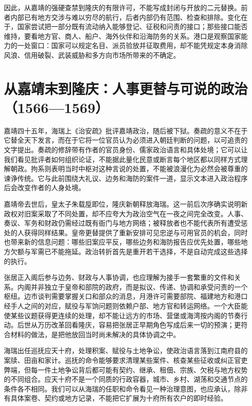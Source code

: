 因此，从嘉靖的强硬查禁到隆庆的有限许可，不能写成封闭与开放的二元替换。前者内部已有地方交涉与难以穷尽的航行，后者内部仍有范围、检查和排除。变化在于，国家尝试把一部分既有流动纳入能够登记、征税和问责的接口；那些接口能否维持，要看地方官、商人、船户、海外伙伴和沿海防务的关系。港口是观察国家能力的一处窗口：国家可以规定名目、派员验放并征取费用，却不能凭规定本身消除风浪、信用破裂、武装威胁和多方向市场所带来的不确定。

\section{从嘉靖末到隆庆：人事更替与可说的政治（1566—1569）}

嘉靖四十五年，海瑞上《治安疏》批评嘉靖政治，随后被下狱。奏疏的意义不在于它替全天下发言，而在于它将一位官员认为必须进入朝廷判断的问题，以可追责的文字提出。奏疏的修辞带有作者的官员身份、儒家政治语言和具体处境；它可以让我们看见批评者如何组织论证，不能据此量化民意或断言每个地区都以同样方式理解朝政。拘系则表明当时中枢对这种言说的处置，不能被浪漫化为必然会被尊重的谏诤传统。它与此前围绕大礼议、边务和海防的案件一道，显示文本进入政治程序后会改变作者的人身处境。

嘉靖帝去世后，皇太子朱载垕即位，隆庆新朝释放海瑞。这一前后次序确实说明新政权对旧案采取了不同处置，却不应夸大为政治空气在一夜之间完全改变。人事、奏议、军务和财政仍需经过既有衙门与地方网络；被释放者也不能代表所有遭受惩处的人获得同样结果。皇帝更替提供了重新安排可见忠逆与可用官员的机会，同时也带来新的信息问题：哪些旧案应平反，哪些边务和海防报告应优先处置，哪些地方欠额与军需已不能拖延。政治转折首先是重开若干选择，不是自动完成这些选择的执行。

张居正入阁后参与边务、财政与人事协调，也应理解为接手一套繁重的文件和关系。内阁并非独立于皇帝和部院的政府，而是拟议、传递、协调和承受问责的一个枢纽。边市谈判需要掌握关口和部众的消息，月港许可需要部院、福建地方和港口经手人之间的对应，赋役与军饷问题则依赖户部、地方官和转运网络。一个大臣能使某些议题获得更连续的处理，却不能让远方的市场、营堡或海湾按内阁的节奏行动。后世从万历改革回看隆庆，容易把张居正早期角色写成后来一切的预演；更符合材料的做法，是把他放回当时尚未解决的具体协调之中。

海瑞出任巡抚应天十府，处理积案、赋役与土地争讼，使政治语言落到江南府县的案牍、田亩和家计。巡抚的命令能够要求清理某些案件、核查某些征收或纠正官吏弊端，但每一件土地争讼背后都可能有契约、继承、租佃、宗族、欠税与地方权势的不同组合。应天十府不是一个同质的行政容器，城市、乡村、湖荡和交通节点的条件各不相同。我们可以从海瑞的任职和命令看见一种治理意图，也应承认，除非有具体案卷、契约或地方记录，不能把它扩展为十府所有农户的即时经验。

